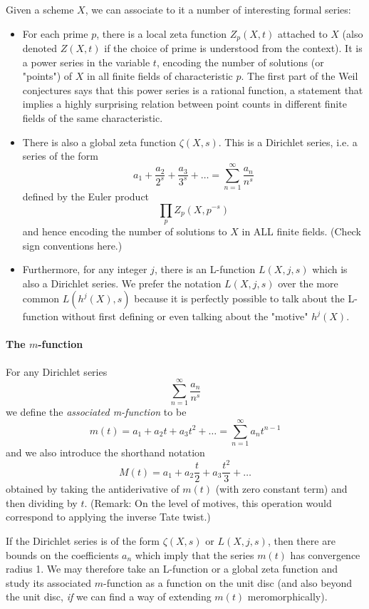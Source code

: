\documentclass[paper=a4, fontsize=11pt]{scrartcl} %
\numberwithin{equation}{section} %
\numberwithin{figure}{section} %
\numberwithin{table}{section} %
\begin{document}
Given a scheme $X$, we can associate to it a number of interesting formal series:
\begin{itemize}

\item For each prime $p$, there is a local zeta function $Z_p(X, t)$ attached to $X$ (also denoted $Z(X, t)$ if the choice of prime is understood from the context). It is a power series in the variable $t$, encoding the number of solutions (or "points") of $X$ in all finite fields of characteristic $p$. The first part of the Weil conjectures says that this power series is a rational function, a statement that implies a highly surprising relation between point counts in different finite fields of the same characteristic.

\item There is also a global zeta function $\zeta(X, s)$. This is a Dirichlet series, i.e. a series of the form
$$ a_1 + \frac{a_2}{2^s} + \frac{a_3}{3^s} + \ldots = \sum_{n=1}^{\infty} \frac{a_n}{n^s}   $$
defined by the Euler product
$$  \prod_p Z_p(X, p^{-s})  $$
and hence encoding the number of solutions to $X$ in ALL finite fields. (Check sign conventions here.)

\item Furthermore, for any integer $j$, there is an L-function $L(X, j, s)$ which is also a Dirichlet series. We prefer the notation $L(X, j, s)$ over the more common $L(h^j(X), s)$ because it is perfectly possible to talk about the L-function without first defining or even talking about the "motive" $h^j(X)$.

\end{itemize}

\paragraph{The $m$-function}
For any Dirichlet series
$$\sum_{n=1}^{\infty} \frac{a_n}{n^s}$$
we define the \emph{associated m-function} to be
$$ m(t) = a_1 + a_2 t + a_3 t^2 + \ldots =  \sum_{n=1}^{\infty} a_n t^{n-1} $$
and we also introduce the shorthand notation
$$ M(t) = a_1 + a_2 \frac{t}{2} + a_3 \frac{t^2}{3} + \ldots   $$
obtained by taking the antiderivative of $m(t)$ (with zero constant term) and then dividing by $t$. (Remark: On the level of motives, this operation would correspond to applying the inverse Tate twist.)

If the Dirichlet series is of the form $\zeta(X, s)$ or $L(X, j, s)$, then there are bounds on the coefficients $a_n$ which imply that the series $m(t)$ has convergence radius 1. We may therefore take an L-function or a global zeta function and study its associated $m$-function as a function on the unit disc (and also beyond the unit disc, \emph{if} we can find a way of extending $m(t)$ meromorphically).
\end{document}
